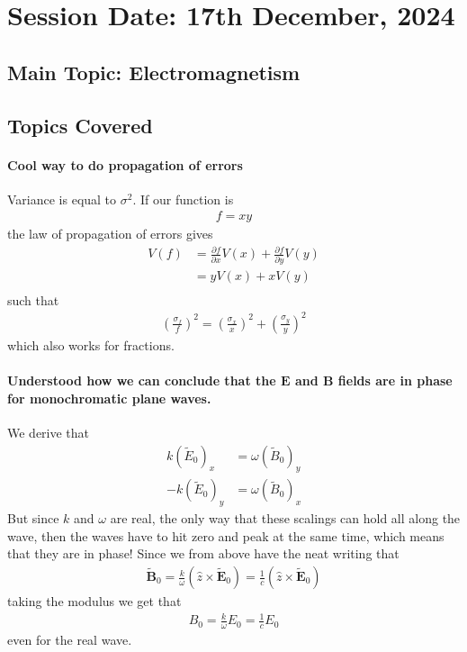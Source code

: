 \section{Session Date: 17th December, 2024}
\subsection*{Main Topic: Electromagnetism}
\subsection*{Topics Covered}
\paragraph{Cool way to do propagation of errors}
Variance is equal to \(\sigma^{2}\). If our function is \begin{align*}
    f = xy
\end{align*}
the law of propagation of errors gives \begin{align*}
    V(f) &= \frac{\partial f}{\partial x}V(x) + \frac{\partial f}{\partial y} V(y)\\
    &= y V(x) + xV(y)\\
\end{align*}
such that \begin{align*}
    \left( \frac{\sigma _f}{f} \right)^{2} = \left( \frac{\sigma_x}{x} \right) ^{2} + \left( \frac{\sigma _y}{y} \right) ^{2} 
\end{align*}
which also works for fractions.

\paragraph{Understood how we can conclude that the \(\mathbf{E}\) and \(\mathbf{B}\) fields are in phase for monochromatic plane waves.}
We derive that \begin{align*}
    k(\tilde{E}_0)_x &= \omega (\tilde{B}_0)_y\\
    -k(\tilde{E}_0)_y &= \omega (\tilde{B}_0)_x
\end{align*}
But since \(k\) and \(\omega \) are real, the only way that these scalings can hold all along the wave, then the waves have to hit zero and peak at the same time, which means that they are in phase! Since we from above have the neat writing that \begin{align*}
    \tilde{\mathbf{B}}_0 = \frac{k}{\omega} (\hat{z} \times \tilde{\mathbf{E}}_0) = \frac{1}{c}(\hat{z} \times \tilde{\mathbf{E}}_0)
\end{align*}
taking the modulus we get that \begin{align*}
    B_0 = \frac{k}{\omega }E_0 = \frac{1}{c} E_0
\end{align*}
even for the real wave.

